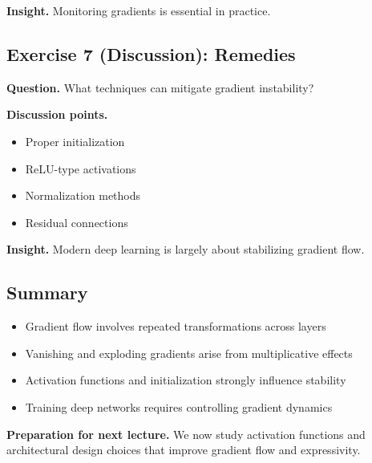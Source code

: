\medskip

\noindent
\textbf{Insight.}  
Monitoring gradients is essential in practice.

\subsection{Exercise 7 (Discussion): Remedies}

\textbf{Question.}  
What techniques can mitigate gradient instability?

\medskip

\noindent
\textbf{Discussion points.}

\begin{itemize}
    \item Proper initialization
    \item ReLU-type activations
    \item Normalization methods
    \item Residual connections
\end{itemize}

\medskip

\noindent
\textbf{Insight.}  
Modern deep learning is largely about stabilizing gradient flow.

\subsection{Summary}

\begin{itemize}
    \item Gradient flow involves repeated transformations across layers
    \item Vanishing and exploding gradients arise from multiplicative effects
    \item Activation functions and initialization strongly influence stability
    \item Training deep networks requires controlling gradient dynamics
\end{itemize}

\medskip

\noindent
\textbf{Preparation for next lecture.}  
We now study activation functions and architectural design choices that improve gradient flow and expressivity.